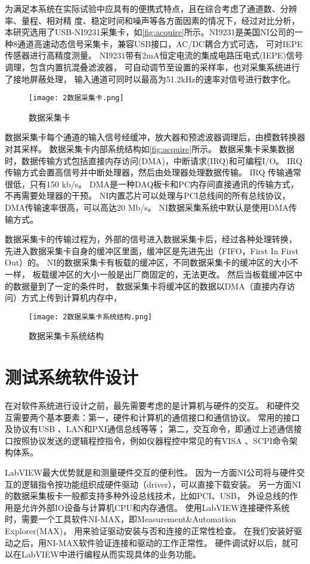 为满足本系统在实际试验中应具有的便携式特点，且在综合考虑了通道数、分辨率、量程、相对精
度、稳定时间和噪声等各方面因素的情况下，经过对比分析，本研究选用了USB-​NI9231采集卡，如\autoref{fig:acquire}所示。
​NI9231是美国NI公司的一种8通道高速动态信号采集卡，兼容USB接口，AC/DC耦合方式可选，
可对IEPE传感器进行高精度测量。
NI9231带有2mA恒定电流的集成电路压电式(IEPE)信号调理，包含内置抗混叠滤波器，
可自动调节至设置的采样率，也对采集系统进行了接地屏蔽处理，
输入通道可同时以最高为51.2$\mathrm{kHz}$的速率对信号进行数字化。

\begin{figure}[htbp]
    \centering
    \texttt{[image: 2数据采集卡.png]}
    \caption{\label{fig:acquire}数据采集卡}
\end{figure}
​
数据采集卡每个通道的输入信号经缓冲，放大器和预滤波器调理后，由模数转换器对其采样。
数据采集卡内部系统结构如\autoref{fig:acquire}所示。
数据采集卡采集数据时，数据传输方式包括直接内存访问(DMA)，中断请求(IRQ)和可编程I/O。
IRQ传输方式会置高信号并中断处理器，然后由处理器处理数据传输。
IRQ 传输通常很低，只有150 kb/s。
DMA是一种DAQ板卡和PC内存间直接通讯的传输方式，不再需要处理器的干预。
NI内置芯片可以处理与PCI总线间的所有总线协议，DMA传输速率很高，可以高达20 Mb/s。
NI数据采集系统中默认是使用DMA传输方式。

数据采集卡的传输过程为，外部的信号进入数据采集卡后，经过各种处理转换，
先进入数据采集卡自身的缓冲区里面，缓冲区是先进先出（FIFO，First In First Out）的。
NI的数据采集卡有板载的缓冲区，不同数据采集卡的缓冲区的大小不一样，
板载缓冲区的大小一般是出厂商固定的，无法更改。
然后当板载缓冲区中的数据量到了一定的条件时，
数据采集卡将缓冲区的数据以DMA（直接内存访问）方式上传到计算机内存中，
\begin{figure}[htbp]
    \centering
    \texttt{[image: 2数据采集卡系统结构.png]}
    \caption{\label{fig:acquire}数据采集卡系统结构}
\end{figure}

\section{测试系统软件设计}
在对软件系统进行设计之前，最先需要考虑的是计算机与硬件的交互。
和硬件交互需要两个基本要素：第一，硬件和计算机的通信接口和通信协议。
常用的接口及协议有USB 、LAN和PXI通信总线等等；
第二，交互命令，即通过上述通信接口按照协议发送的逻辑程控指令，例如仪器程控中常见的有VISA 、SCPI命令架构体系。

LabVIEW最大优势就是和测量硬件交互的便利性。
因为一方面NI公司将与硬件交互的逻辑指令按功能组织成硬件驱动（driver），可以直接下载安装。
另一方面NI的数据采集板卡一般都支持多种外设总线技术，比如PCI、USB，
外设总线的作用是允许外部IO设备与计算机CPU和内存通信。
使用LabVIEW连接硬件系统时，需要一个工具软件NI-MAX，即Measurement\&Automation Explorer(MAX)，
用来验证驱动安装与否和连接的正常性检查。
在我们安装好驱动之后，用NI-MAX软件验证连接和驱动的工作正常性。
硬件调试好以后，就可以在LabVIEW中进行编程从而实现具体的业务功能。


